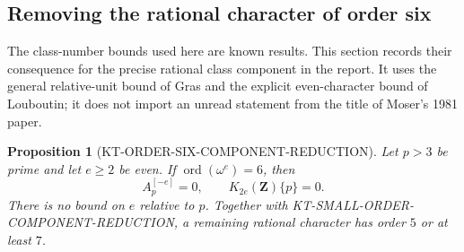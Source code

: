 \documentclass[11pt,a4paper]{article}
\newtheorem{proposition}[theorem]{Proposition}
\theoremstyle{definition}
\begin{document}


\subsection{Removing the rational character of order six}
\label{sec:kt-order-six}

The class-number bounds used here are known results.  This section
records their consequence for the precise rational class component in
the report.  It uses the general relative-unit bound of Gras and the
explicit even-character bound of Louboutin; it does not import an
unread statement from the title of Moser's 1981 paper.

\begin{proposition}[KT-ORDER-SIX-COMPONENT-REDUCTION]
Let $p>3$ be prime and let $e\ge2$ be even.  If
$\operatorname{ord}(\omega^e)=6$, then
\[
                 A_p^{[-e]}=0,
                 \qquad K_{2e}(\mathbf Z)\{p\}=0.       \tag{OS6.1}
\]
There is no bound on $e$ relative to $p$.
Together with KT-SMALL-ORDER-COMPONENT-REDUCTION, a remaining
rational character has order $5$ or at least $7$.
\end{proposition}
\end{document}
